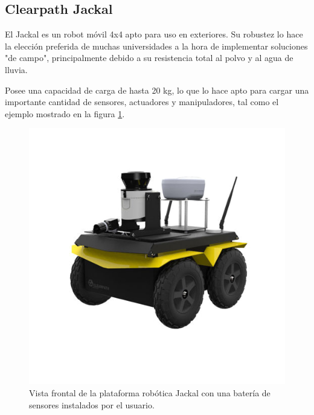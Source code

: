 
\subsection{Clearpath Jackal}

El Jackal es un robot móvil 4x4 apto para uso en exteriores. Su robustez lo hace la elección preferida de muchas universidades a la hora de implementar soluciones "de campo", principalmente debido a su resistencia total al polvo y al agua de lluvia.

\newpage

Posee una capacidad de carga de hasta 20 kg, lo que lo hace apto para cargar una importante cantidad de sensores, actuadores y manipuladores, tal como el ejemplo mostrado en la figura \ref{fig:robotJackal}.

\begin{figure}[ht]
	\centering
	\includegraphics[scale=1.6]{./Figures/jackal.png}
	\caption{Vista frontal de la plataforma robótica Jackal con una batería de sensores instalados por el usuario.\protect\footnotemark}
	\label{fig:robotJackal}
\end{figure}


